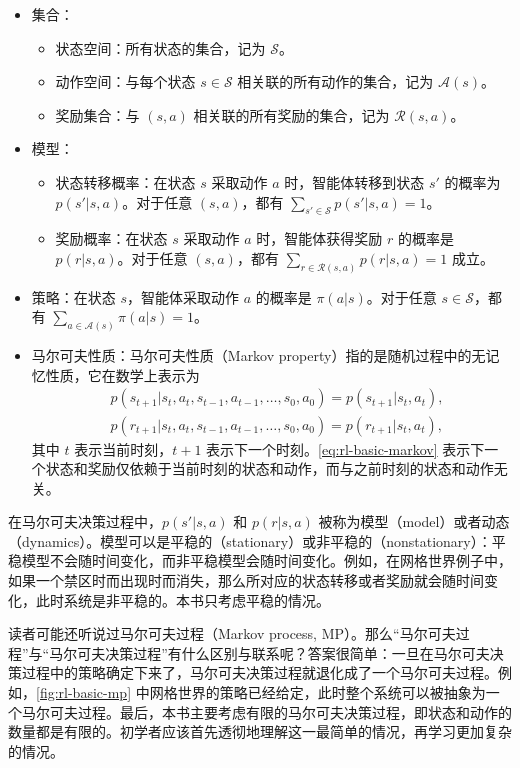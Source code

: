 \begin{itemize}
  \item 集合：
  \begin{itemize}
    \item 状态空间：所有状态的集合，记为 $\mathcal{S}$。
    \item 动作空间：与每个状态 $s \in \mathcal{S}$ 相关联的所有动作的集合，记为 $\mathcal{A}(s)$。
    \item 奖励集合：与 $(s, a)$ 相关联的所有奖励的集合，记为 $\mathcal{R}(s, a)$。
  \end{itemize}
  \item 模型：
  \begin{itemize}
    \item 状态转移概率：在状态 $s$ 采取动作 $a$ 时，智能体转移到状态 $s'$ 的概率为 $p(s'|s,a)$。对于任意 $(s,a)$，都有 $\sum_{s' \in \mathcal{S}} p(s'|s,a) = 1$。
    \item 奖励概率：在状态 $s$ 采取动作 $a$ 时，智能体获得奖励 $r$ 的概率是 $p(r|s,a)$。对于任意 $(s,a)$，都有 $\sum_{r \in \mathcal{R}(s,a)} p(r|s,a) = 1$ 成立。
  \end{itemize}
  \item 策略：在状态 $s$，智能体采取动作 $a$ 的概率是 $\pi(a|s)$。对于任意 $s \in \mathcal{S}$，都有 $\sum_{a \in \mathcal{A}(s)} \pi(a|s) = 1$。
  \item 马尔可夫性质：马尔可夫性质（Markov property）指的是随机过程中的无记忆性质，它在数学上表示为
\begin{equation}
\begin{aligned}
  & p(s_{t+1} | s_t, a_t, s_{t-1}, a_{t-1}, \ldots, s_0, a_0) = p(s_{t+1} | s_t, a_t), \\
  & p(r_{t+1} | s_t, a_t, s_{t-1}, a_{t-1}, \ldots, s_0, a_0) = p(r_{t+1} | s_t, a_t),
\end{aligned}
\label{eq:rl-basic-markov}
\end{equation}
  其中 $t$ 表示当前时刻，$t+1$ 表示下一个时刻。\cref{eq:rl-basic-markov} 表示下一个状态和奖励仅依赖于当前时刻的状态和动作，而与之前时刻的状态和动作无关。
\end{itemize}

在马尔可夫决策过程中，$p(s'|s,a)$ 和 $p(r|s,a)$ 被称为模型（model）或者动态（dynamics）。模型可以是平稳的（stationary）或非平稳的（nonstationary）：平稳模型不会随时间变化，而非平稳模型会随时间变化。例如，在网格世界例子中，如果一个禁区时而出现时而消失，那么所对应的状态转移或者奖励就会随时间变化，此时系统是非平稳的。本书只考虑平稳的情况。

读者可能还听说过马尔可夫过程（Markov process, MP）。那么“马尔可夫过程”与“马尔可夫决策过程”有什么区别与联系呢？答案很简单：一旦在马尔可夫决策过程中的策略确定下来了，马尔可夫决策过程就退化成了一个马尔可夫过程。例如，\cref{fig:rl-basic-mp} 中网格世界的策略已经给定，此时整个系统可以被抽象为一个马尔可夫过程。最后，本书主要考虑有限的马尔可夫决策过程，即状态和动作的数量都是有限的。初学者应该首先透彻地理解这一最简单的情况，再学习更加复杂的情况。

